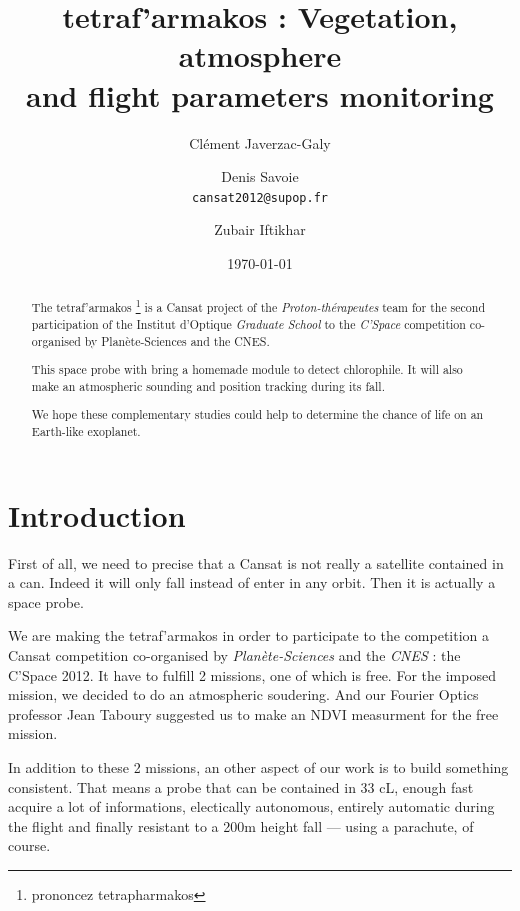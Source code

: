 \documentclass[twocolumn,10pt]{article}
\newcommand\tet{\textgreek{tetraf'armakos} }
\begin{document}
\title{\tet %
: Vegetation, atmosphere\\ and flight parameters monitoring} 
\author{Clément Javerzac-Galy \and{Denis Savoie}\\
\texttt{cansat2012@supop.fr}
\and{Zubair Iftikhar}
}
\date{\today}
\maketitle
 
\begin{abstract}
    \begin{bfseries}
    \par The \tet \footnote{prononcez tetrapharmakos} is a Cansat project of the \textit{Proton-thérapeutes} team for the second participation of the Institut d'Optique \textit{Graduate School} to the \textit{C'Space} competition co-organised by Planète-Sciences and the CNES. 
    \par This space probe with bring a homemade module to detect chlorophile. It will also make an atmospheric sounding and position tracking during its fall.
    \par We hope these complementary studies could help to determine the chance of life on an Earth-like exoplanet.
     \end{bfseries}
\end{abstract}
\section{Introduction}%
    \par First of all, we need to precise that a Cansat is not really a satellite contained in a can. Indeed it will only fall instead of enter in any orbit. Then it is actually a space probe.
    \par We are making the \tet in order to participate to the competition a Cansat competition co-organised by \textit{Planète-Sciences} and the \textit{CNES} : the C'Space 2012. It have to fulfill 2 missions, one of which is free. For the imposed mission, we decided to do an atmospheric soudering. And our Fourier Optics professor Jean Taboury suggested us to make an NDVI measurment for the free mission.
    \par In addition to these 2 missions, an other aspect of our work is to build something consistent. That means a probe that can be contained in 33 cL, enough fast acquire a lot of informations, electically autonomous, entirely automatic during the flight and finally resistant to a 200m height fall --- using a parachute, of course.
\end{document}
